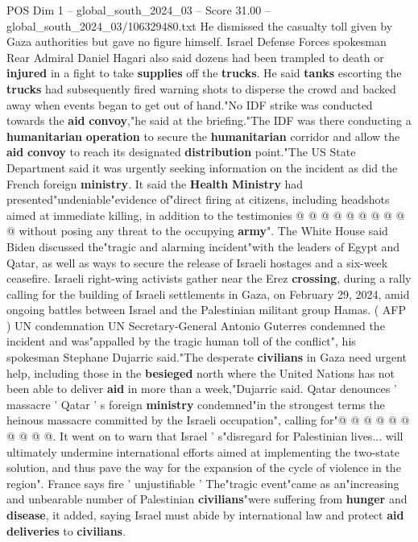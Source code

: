 \begin{textsample}{POS Dim 1 – global\_south\_2024\_03 – Score 31.00 – global\_south\_2024\_03/106329480.txt}
He dismissed the casualty toll given by Gaza authorities but gave no figure himself.
Israel Defense Forces spokesman Rear Admiral Daniel Hagari also said dozens had been trampled to death or \textbf{injured} in a fight to take \textbf{supplies} off the \textbf{trucks}.
He said \textbf{tanks} escorting the \textbf{trucks} had subsequently fired warning shots to disperse the crowd and backed away when events began to get out of hand."No IDF strike was conducted towards the \textbf{aid} \textbf{convoy},"he said at the briefing."The IDF was there conducting a \textbf{humanitarian} \textbf{operation} to secure the \textbf{humanitarian} corridor and allow the \textbf{aid} \textbf{convoy} to reach its designated \textbf{distribution} point."The US State Department said it was urgently seeking information on the incident as did the French foreign \textbf{ministry}.
It said the \textbf{Health} \textbf{Ministry} had presented"undeniable"evidence of"direct firing at citizens, including headshots aimed at immediate killing, in addition to the testimonies @ @ @ @ @ @ @ @ @ @ without posing any threat to the occupying \textbf{army}".
The White House said Biden discussed the"tragic and alarming incident"with the leaders of Egypt and Qatar, as well as ways to secure the release of Israeli hostages and a six-week ceasefire.
Israeli right-wing activists gather near the Erez \textbf{crossing}, during a rally calling for the building of Israeli settlements in Gaza, on February 29, 2024, amid ongoing battles between Israel and the Palestinian militant group Hamas. ( AFP ) UN condemnation UN Secretary-General Antonio Guterres condemned the incident and was"appalled by the tragic human toll of the conflict", his spokesman Stephane Dujarric said."The desperate \textbf{civilians} in Gaza need urgent help, including those in the \textbf{besieged} north where the United Nations has not been able to deliver \textbf{aid} in more than a week,"Dujarric said.
Qatar denounces ' massacre ' Qatar ' s foreign \textbf{ministry} condemned"in the strongest terms the heinous massacre committed by the Israeli occupation", calling for"@ @ @ @ @ @ @ @ @ @.
It went on to warn that Israel ' s"disregard for Palestinian lives... will ultimately undermine international efforts aimed at implementing the two-state solution, and thus pave the way for the expansion of the cycle of violence in the region".
France says fire ' unjustifiable ' The"tragic event"came as an"increasing and unbearable number of Palestinian \textbf{civilians}"were suffering from \textbf{hunger} and \textbf{disease}, it added, saying Israel must abide by international law and protect \textbf{aid} \textbf{deliveries} to \textbf{civilians}.

\end{textsample}
